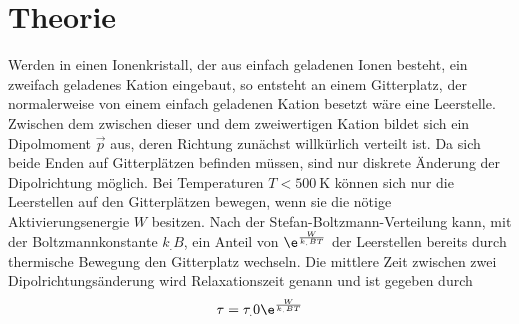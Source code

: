 \section{Theorie}
\label{sec:Theorie}

Werden in einen Ionenkristall, der aus einfach geladenen Ionen besteht, ein zweifach geladenes Kation eingebaut, so entsteht an einem Gitterplatz, der normalerweise von einem einfach geladenen Kation besetzt wäre eine Leerstelle.
Zwischen dem zwischen dieser und dem zweiwertigen Kation bildet sich ein Dipolmoment $\vec{p}$ aus, deren Richtung zunächst willkürlich verteilt ist. Da sich beide Enden auf Gitterplätzen befinden müssen, sind nur diskrete Änderung der Dipolrichtung möglich. Bei Temperaturen $T<\SI{500}{\kelvin}$ können sich nur die Leerstellen auf den Gitterplätzen bewegen, wenn sie die nötige Aktivierungsenergie $W$ besitzen. Nach der Stefan-Boltzmann-Verteilung kann, mit der Boltzmannkonstante $k_.B$, ein Anteil von $\e^{\frac{W}{k_.BT}}$ der Leerstellen bereits durch thermische Bewegung den Gitterplatz wechseln.
Die mittlere Zeit zwischen zwei Dipolrichtungsänderung wird Relaxationszeit genann und ist gegeben durch
\begin{equation}
\tau=\tau_.0\e^{\frac{W}{k_.BT}}\label{eq:tau}
\end{equation}

